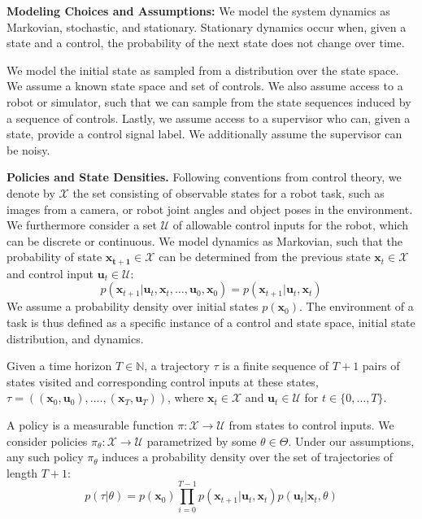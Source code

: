 \documentclass[10pt, conference]{ieeeconf}      %
\newcommand{\bu}{\mathbf{u}}
\newcommand{\bx}{\mathbf{x}}
\begin{document}
\noindent\textbf{Modeling Choices and Assumptions:}  We model the system dynamics as Markovian, stochastic, and stationary. Stationary dynamics occur when, given a state and a control, the probability of the next state does not change over time. 

We model the initial state as sampled from a distribution over the state space.
We assume a known state space and set of controls. We also assume access to a robot or simulator, such that we  can sample from the state sequences induced by a sequence of controls.
Lastly, we assume access to a supervisor who can, given a state, provide a control signal label.
We additionally assume the supervisor can be noisy. 

\noindent\textbf{Policies and State Densities.}
Following conventions from control theory, we denote by $\mathcal{X}$ the set consisting of observable states for a robot task, such as images from a camera, or robot joint angles and object poses in the environment.
We furthermore consider a set $\mathcal{U}$ of allowable control inputs for the robot, which can be discrete or
continuous. We model dynamics as Markovian, such that the probability of state $\mathbf{x_{t+1}}\in
\mathcal{X}$ can be determined from the previous state $\mathbf{x}_t\in\mathcal{X}$ and control input $\mathbf{u}_t\in
\mathcal{U}$: 
$$p(\bx_{t+1}|\bu_{t},\bx_{t}, \ldots, \bu_{0}, \bx_{0})=p(\bx_{t+1}|\bu_{t}, \bx_t)$$
We assume a probability density over initial states $p(\bx_0)$.
The environment of a task is thus defined as a specific instance of a control and state space, initial state distribution, and dynamics. 



Given a time horizon $T\in \mathbb{N}$, a trajectory $\tau$ is a finite sequence of $T+1$ pairs of states visited and corresponding
control inputs at these states, $\tau = ((\mathbf{x}_0,\mathbf{u}_0), ...., (\mathbf{x}_T,\mathbf{u}_T))$, where $\bx_t\in \mathcal{X}$
and $\bu_t\in \mathcal{U}$ for $t\in \{0, \ldots, T\}$.


A policy is a measurable function $\pi: \mathcal{X} \to \mathcal{U}$ from states to control inputs. 
We consider policies $\pi_{\theta}:\mathcal{X}\to \mathcal{U}$ parametrized by some $\theta\in \Theta$. Under our assumptions, any such policy $\pi_{\theta}$ induces a probability density over the set of  trajectories of length $T+1$: $$p(\tau | \theta)=
p(\bx_0)\prod_{i=0}^{T-1}p(\bx_{t+1}|\bu_t,\bx_t)p(\bu_t|\bx_t,\theta)$$
\end{document}
